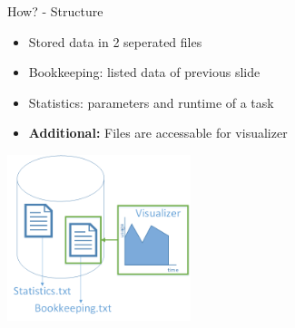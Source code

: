 	\begin{frame}{How? - Structure}
		\begin{itemize}
		\item<1->{} {Stored data in 2 seperated files}
		\item<2->{} {Bookkeeping: listed data of previous slide}
		\item<3->{} {Statistics: parameters and runtime of a task}
		\item<5->{} {\textbf{Additional: }Files are accessable for visualizer}
		\end{itemize}
		\includegraphics[width=0.4\textwidth]{images/Task/data.png}
	\end{frame}
